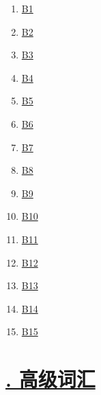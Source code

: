 \documentclass[11pt]{article}
\begin{document}
\begin{multicols}{5}
	\begin{enumerate}
		\item \href{https://mp.weixin.qq.com/s/W4k0zFiy96QevrpepntSdA}{B1}	%
		\item \href{https://mp.weixin.qq.com/s/ZQD2C48hWjmlON61IBxasg}{B2}	%
		\item \href{https://mp.weixin.qq.com/s/Wj62Z_jOt7MS0NFNWg9oPQ}{B3}	%
		\item \href{https://mp.weixin.qq.com/s/lR_X4mRjBctAkMq-EMsYug}{B4}	%
		\item \href{https://mp.weixin.qq.com/s/lMj3GuEJvzNnQL-p_eUzqQ}{B5}	%
		\item \href{https://mp.weixin.qq.com/s/8n8glcJgbNzMw57Y-Ajt7Q}{B6}	%
		\item \href{https://mp.weixin.qq.com/s/vnbgL7-CH6by9wIUO0Fffw}{B7}	%
		\item \href{https://mp.weixin.qq.com/s/PGmWUqtg-GRWRDiyb1P0-g}{B8}	%
		\item \href{https://mp.weixin.qq.com/s/eUmYfh0NqUHHS4hbW5-UUA}{B9}	%
		\item \href{https://mp.weixin.qq.com/s/u0lK7-EGM1FeDyrOAtuCWw}{B10}	%
		\item \href{https://mp.weixin.qq.com/s/0HylKPoWVNfUb6BZOj1Mvw}{B11}	%
		\item \href{https://mp.weixin.qq.com/s/chuUIqH0dWJo51x_ypSYqg}{B12}	%
		\item \href{https://mp.weixin.qq.com/s/Xy0Lyfkz8DVE0GUOjEx1Xw}{B13}	%
		\item \href{https://mp.weixin.qq.com/s/yrufPG8ojW3Prmc_GpO-1A}{B14}	%
		\item \href{https://mp.weixin.qq.com/s/HPb3-4ljuXKyVS9P3F72cw}{B15}	%
	\end{enumerate}
	
\end{multicols}


\vspace{-0.5cm}

\section*{\normalfont \large \href{https://www.youtube.com/watch?v=hC8Sr9_WYqo&list=PL7aIrlqqP5K-zxRef5HsWBdBQrMXy4bNp}{. 高级词汇} }

\vspace{-0.5cm}
\end{document}
